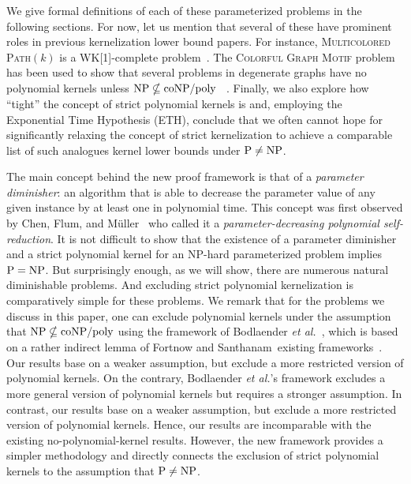 \documentclass[11pt,a4,USenglish]{article}
\newcommand{\prob}[1]{\textsc{#1}}
\newcommand{\pprob}[2]{\prob{#1}$(#2)$}
\newcommand{\coNP}{\textnormal{coNP}}
\newcommand{\coNPslashpoly}{\textnormal{\coNP{}$/$poly}}
\newcommand{\NP}{\textnormal{NP}}
\newcommand{\PTIME}{\textnormal{P}}
\newcommand{\PnotNP}{$\PTIME{}\neq\NP{}$}
\newcommand{\PeqNP}{$\PTIME{}=\NP{}$}
\newcommand{\NPnotincoNPslashpoly}{$\NP{}\nsubseteq\coNPslashpoly{}$}
\theoremstyle{definition}
\theoremstyle{plain}
\theoremstyle{remark}
\begin{document}
We give formal definitions of each of these parameterized problems in the following sections. 
For now, let us mention that several of these have prominent roles in previous kernelization lower bound papers.
%
%
%
%
  For instance, \pprob{Multicolored Path}{k} is a WK[1]-complete problem~\cite{HermelinKSWW15}. 
%
  The \prob{Colorful Graph Motif} problem has been used to show that several problems in degenerate graphs have no polynomial kernels unless \NPnotincoNPslashpoly{}~\cite{CyganPPW12}
%
  .
Finally, we also explore how ``tight'' the concept of strict polynomial 
kernels is and, employing the Exponential Time Hypothesis (ETH), 
conclude that we often cannot hope for significantly relaxing the 
concept of strict kernelization to achieve a comparable list of such analogues kernel lower bounds 
under \PnotNP{}.

The main concept behind the new proof framework is that of a \emph{parameter diminisher}: an algorithm that is able to decrease the parameter value of any given instance by at least one in polynomial time. This concept was first observed by Chen, Flum, and M\"{u}ller~\cite{chen2011lower} who called it a \emph{parameter-decreasing polynomial self-reduction}. It is not difficult to show that the existence of a parameter diminisher and a strict polynomial kernel for an \NP{}-hard parameterized problem implies \PeqNP{}. But surprisingly enough, as we will show, there are numerous natural diminishable problems. 
And excluding strict polynomial kernelization is comparatively simple for these problems. 
We remark that for the problems we discuss in this paper, one can exclude polynomial kernels under the assumption that \NPnotincoNPslashpoly{} using the \iflong{}framework of Bodlaender \emph{et al.}~\cite{BodlaenderDFH09}, which is based on a rather indirect lemma of Fortnow and Santhanam~\cite{FortnowS11}\else{}existing frameworks~\cite{BodlaenderDFH09,Kra14}\fi{}. 
\iflong{}%
  Our results base on a weaker assumption, but exclude a more restricted version of polynomial kernels. 
  On the contrary, Bodlaender \emph{et al.}'s framework excludes a more general version of polynomial kernels but requires a stronger assumption. 
\else{}%
  In contrast, our results base on a weaker assumption, but exclude a more restricted version of polynomial kernels.
\fi{}%
%
Hence, our results are incomparable with the existing no-polynomial-kernel results. 
However, the new framework provides a simpler methodology and directly connects the exclusion of strict polynomial kernels to the assumption that \PnotNP{}.
\end{document}
